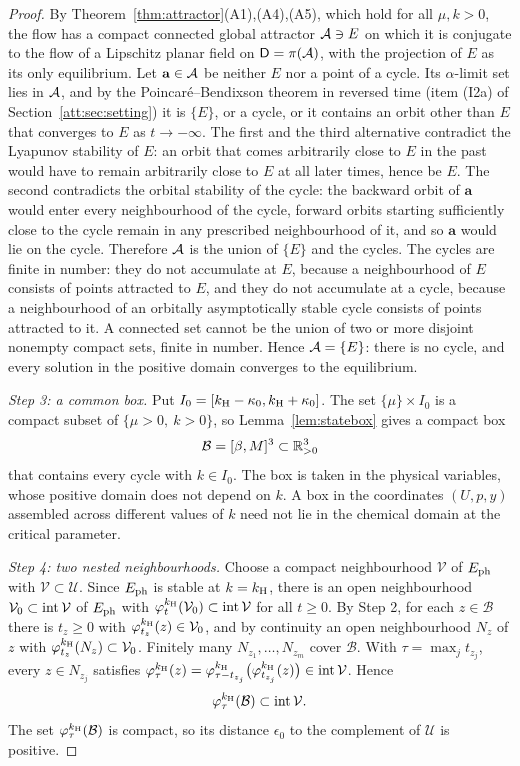 \begin{proof}
By Theorem~\ref{thm:attractor}(A1),(A4),(A5), which hold for all $\mu,k>0$, the flow has a compact connected global attractor $\mathcal A\ni E$ on which it is conjugate to the flow of a Lipschitz planar field on $\mathsf D=\pi(\mathcal A)$, with the projection of $E$ as its only equilibrium. Let $\mathbf a\in\mathcal A$ be neither $E$ nor a point of a cycle. Its $\alpha$-limit set lies in $\mathcal A$, and by the Poincar\'e--Bendixson theorem in reversed time (item (I2a) of Section~\ref{att:sec:setting}) it is $\{E\}$, or a cycle, or it contains an orbit other than $E$ that converges to $E$ as $t\to-\infty$. The first and the third alternative contradict the Lyapunov stability of $E$: an orbit that comes arbitrarily close to $E$ in the past would have to remain arbitrarily close to $E$ at all later times, hence be $E$. The second contradicts the orbital stability of the cycle: the backward orbit of $\mathbf a$ would enter every neighbourhood of the cycle, forward orbits starting sufficiently close to the cycle remain in any prescribed neighbourhood of it, and so $\mathbf a$ would lie on the cycle. Therefore $\mathcal A$ is the union of $\{E\}$ and the cycles. The cycles are finite in number: they do not accumulate at $E$, because a neighbourhood of $E$ consists of points attracted to $E$, and they do not accumulate at a cycle, because a neighbourhood of an orbitally asymptotically stable cycle consists of points attracted to it. A connected set cannot be the union of two or more disjoint nonempty compact sets, finite in number. Hence $\mathcal A=\{E\}$: there is no cycle, and every solution in the positive domain converges to the equilibrium.

\emph{Step 3: a common box.} Put $I_0=[k_{\mathrm H}-\kappa_0,k_{\mathrm H}+\kappa_0]$. The set $\{\mu\}\times I_0$ is a compact subset of $\{\mu>0,\ k>0\}$, so Lemma~\ref{lem:statebox} gives a compact box
\[
\mathcal B=[\beta,M]^3\subset\mathbb R^3_{>0}
\]
that contains every cycle with $k\in I_0$. The box is taken in the physical variables, whose positive domain does not depend on $k$. A box in the coordinates $(U,p,y)$ assembled across different values of $k$ need not lie in the chemical domain at the critical parameter.

\emph{Step 4: two nested neighbourhoods.} Choose a compact neighbourhood $\mathcal V$ of $E_{\rm ph}$ with $\mathcal V\subset\mathcal U$. Since $E_{\rm ph}$ is stable at $k=k_{\mathrm H}$, there is an open neighbourhood $\mathcal V_0\subset\operatorname{int}\mathcal V$ of $E_{\rm ph}$ with $\varphi^{k_{\mathrm H}}_t(\mathcal V_0)\subset\operatorname{int}\mathcal V$ for all $t\ge0$. By Step 2, for each $z\in\mathcal B$ there is $t_z\ge0$ with $\varphi^{k_{\mathrm H}}_{t_z}(z)\in\mathcal V_0$, and by continuity an open neighbourhood $N_z$ of $z$ with $\varphi^{k_{\mathrm H}}_{t_z}(N_z)\subset\mathcal V_0$. Finitely many $N_{z_1},\dots,N_{z_m}$ cover $\mathcal B$. With $\tau=\max_jt_{z_j}$, every $z\in N_{z_j}$ satisfies $\varphi^{k_{\mathrm H}}_\tau(z)=\varphi^{k_{\mathrm H}}_{\tau-t_{z_j}}\bigl(\varphi^{k_{\mathrm H}}_{t_{z_j}}(z)\bigr)\in\operatorname{int}\mathcal V$. Hence
\[
\varphi^{k_{\mathrm H}}_\tau(\mathcal B)\subset\operatorname{int}\mathcal V .
\]
The set $\varphi^{k_{\mathrm H}}_\tau(\mathcal B)$ is compact, so its distance $\epsilon_0$ to the complement of $\mathcal U$ is positive.


\end{proof}
